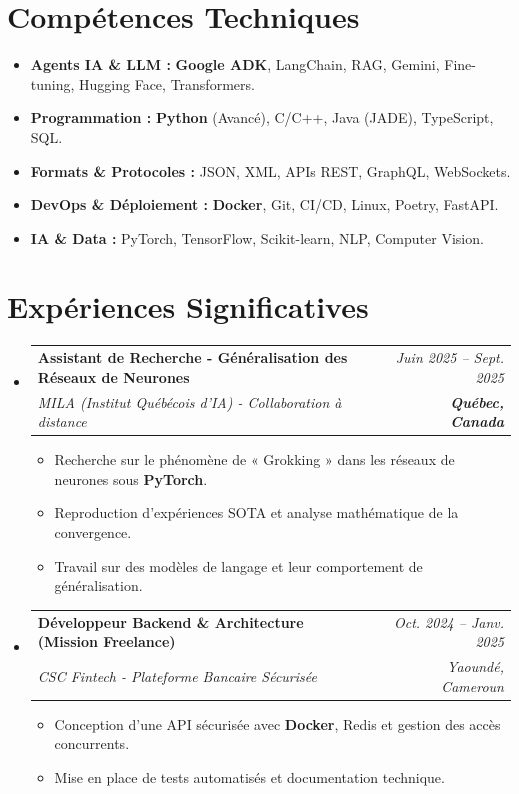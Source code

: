 \documentclass[a4paper,11pt]{article}
\makeatletter
\newcommand{\resumeSubheading}[4]{
  \vspace{-1pt}\item
    \begin{tabular*}{0.97\textwidth}[t]{l@{\extracolsep{\fill}}r}
      \textbf{#1} & \textit{\small #2} \\
      \textit{\small #3} & \textit{\small #4} \\
    \end{tabular*}\vspace{-5pt}
}
\makeatother
\begin{document}
\section{Compétences Techniques}
\begin{itemize}[leftmargin=*, nosep]
    \item \small{\textbf{Agents IA \& LLM :} \textbf{Google ADK}, LangChain, RAG, Gemini, Fine-tuning, Hugging Face, Transformers.}
    \item \small{\textbf{Programmation :} \textbf{Python} (Avancé), C/C++, Java (JADE), TypeScript, SQL.}
    \item \small{\textbf{Formats \& Protocoles :} JSON, XML, APIs REST, GraphQL, WebSockets.}
    \item \small{\textbf{DevOps \& Déploiement :} \textbf{Docker}, Git, CI/CD, Linux, Poetry, FastAPI.}
    \item \small{\textbf{IA \& Data :} PyTorch, TensorFlow, Scikit-learn, NLP, Computer Vision.}
\end{itemize}

\section{Expériences Significatives}
\begin{itemize}[leftmargin=*, label={}]

    \resumeSubheading
      {Assistant de Recherche - Généralisation des Réseaux de Neurones}{Juin 2025 -- Sept. 2025}
      {MILA (Institut Québécois d'IA) - Collaboration à distance}{\textbf{Québec, Canada}}
      \begin{itemize}[leftmargin=0.4cm, nosep, label=\tiny$\bullet$]
        \item \small{Recherche sur le phénomène de « Grokking » dans les réseaux de neurones sous \textbf{PyTorch}.}
        \item \small{Reproduction d'expériences SOTA et analyse mathématique de la convergence.}
        \item \small{Travail sur des modèles de langage et leur comportement de généralisation.}
      \end{itemize}
    \vspace{2pt}

    \resumeSubheading
      {Développeur Backend \& Architecture (Mission Freelance)}{Oct. 2024 -- Janv. 2025}
      {CSC Fintech - Plateforme Bancaire Sécurisée}{Yaoundé, Cameroun}
      \begin{itemize}[leftmargin=0.4cm, nosep, label=\tiny$\bullet$]
        \item \small{Conception d'une API sécurisée avec \textbf{Docker}, Redis et gestion des accès concurrents.}
        \item \small{Mise en place de tests automatisés et documentation technique.}
      \end{itemize}
\end{itemize}
\end{document}
